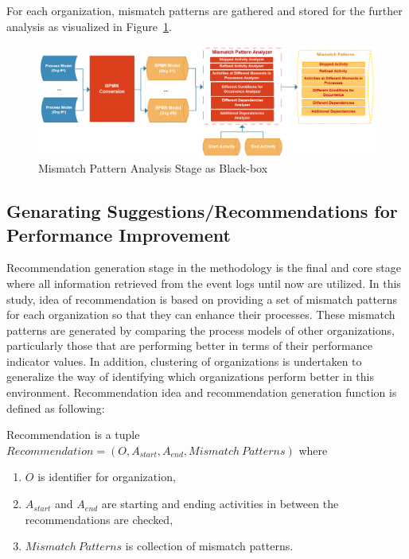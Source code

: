 For each organization, mismatch patterns are gathered and stored for the further analysis as visualized in Figure~\ref{fig:mismatch-pattern-analysis-blackbox}.
\begin{figure}
  \centering
  \includegraphics[width=\textwidth]{4_methodology/mismatch-pattern-analysis-blackbox}
  \caption{Mismatch Pattern Analysis Stage as Black-box}
  \label{fig:mismatch-pattern-analysis-blackbox}
\end{figure}

\subsection{Genarating Suggestions/Recommendations for Performance Improvement}
\label{subsec:recommendation-generation}
Recommendation generation stage in the methodology is the final and core stage where all information retrieved from the event logs until now are utilized. In this study, idea of recommendation is based on providing a set of mismatch patterns for each organization so that they can enhance their processes. These mismatch patterns are generated by comparing the process models of other organizations, particularly those that are performing better in terms of their performance indicator values. In addition, clustering of organizations is undertaken to generalize the way of identifying which organizations perform better in this environment. Recommendation idea and recommendation generation function is defined as following:
\theoremstyle{definition}
\begin{definition}
Recommendation is a tuple ${Recommendation} = (O, A_{start}, A_{end}, Mismatch\ Patterns) $ where 
  \begin{enumerate}
    \item $O$ is identifier for organization,
    \item $A_{start}$ and $A_{end}$ are starting and ending activities in between the recommendations are checked,
    \item $Mismatch\ Patterns$ is collection of mismatch patterns.
  \end{enumerate}
\end{definition}

